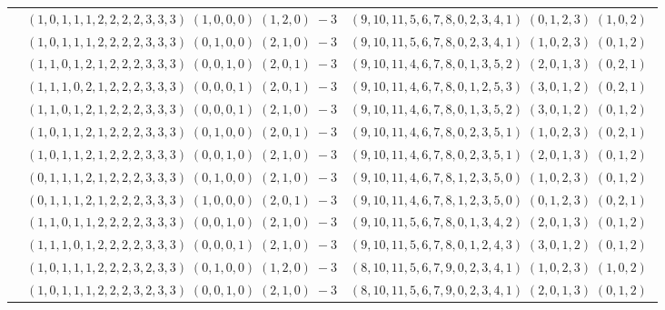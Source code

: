 \documentclass[11pt]{article}
\begin{document}
\begin{longtable}[l]{|c|c|c|}
 \cline{2-3} 
 & $(1 ,0 ,1 ,1 ,1 ,2 ,2 ,2 ,2 ,3 ,3 ,3) \;(1 ,0 ,0 ,0) \;(1 ,2 ,0) \;-3$ & $(9 ,10 ,11 ,5 ,6 ,7 ,8 ,0 ,2 ,3 ,4 ,1) \;(0 ,1 ,2 ,3) \;(1 ,0 ,2) \;$\\ 
 \cline{2-3} 
 & $(1 ,0 ,1 ,1 ,1 ,2 ,2 ,2 ,2 ,3 ,3 ,3) \;(0 ,1 ,0 ,0) \;(2 ,1 ,0) \;-3$ & $(9 ,10 ,11 ,5 ,6 ,7 ,8 ,0 ,2 ,3 ,4 ,1) \;(1 ,0 ,2 ,3) \;(0 ,1 ,2) \;$\\ 
 \cline{2-3} 
 & $(1 ,1 ,0 ,1 ,2 ,1 ,2 ,2 ,2 ,3 ,3 ,3) \;(0 ,0 ,1 ,0) \;(2 ,0 ,1) \;-3$ & $(9 ,10 ,11 ,4 ,6 ,7 ,8 ,0 ,1 ,3 ,5 ,2) \;(2 ,0 ,1 ,3) \;(0 ,2 ,1) \;$\\ 
 \cline{2-3} 
 & $(1 ,1 ,1 ,0 ,2 ,1 ,2 ,2 ,2 ,3 ,3 ,3) \;(0 ,0 ,0 ,1) \;(2 ,0 ,1) \;-3$ & $(9 ,10 ,11 ,4 ,6 ,7 ,8 ,0 ,1 ,2 ,5 ,3) \;(3 ,0 ,1 ,2) \;(0 ,2 ,1) \;$\\ 
 \cline{2-3} 
 & $(1 ,1 ,0 ,1 ,2 ,1 ,2 ,2 ,2 ,3 ,3 ,3) \;(0 ,0 ,0 ,1) \;(2 ,1 ,0) \;-3$ & $(9 ,10 ,11 ,4 ,6 ,7 ,8 ,0 ,1 ,3 ,5 ,2) \;(3 ,0 ,1 ,2) \;(0 ,1 ,2) \;$\\ 
 \cline{2-3} 
 & $(1 ,0 ,1 ,1 ,2 ,1 ,2 ,2 ,2 ,3 ,3 ,3) \;(0 ,1 ,0 ,0) \;(2 ,0 ,1) \;-3$ & $(9 ,10 ,11 ,4 ,6 ,7 ,8 ,0 ,2 ,3 ,5 ,1) \;(1 ,0 ,2 ,3) \;(0 ,2 ,1) \;$\\ 
 \cline{2-3} 
 & $(1 ,0 ,1 ,1 ,2 ,1 ,2 ,2 ,2 ,3 ,3 ,3) \;(0 ,0 ,1 ,0) \;(2 ,1 ,0) \;-3$ & $(9 ,10 ,11 ,4 ,6 ,7 ,8 ,0 ,2 ,3 ,5 ,1) \;(2 ,0 ,1 ,3) \;(0 ,1 ,2) \;$\\ 
 \cline{2-3} 
 & $(0 ,1 ,1 ,1 ,2 ,1 ,2 ,2 ,2 ,3 ,3 ,3) \;(0 ,1 ,0 ,0) \;(2 ,1 ,0) \;-3$ & $(9 ,10 ,11 ,4 ,6 ,7 ,8 ,1 ,2 ,3 ,5 ,0) \;(1 ,0 ,2 ,3) \;(0 ,1 ,2) \;$\\ 
 \cline{2-3} 
 & $(0 ,1 ,1 ,1 ,2 ,1 ,2 ,2 ,2 ,3 ,3 ,3) \;(1 ,0 ,0 ,0) \;(2 ,0 ,1) \;-3$ & $(9 ,10 ,11 ,4 ,6 ,7 ,8 ,1 ,2 ,3 ,5 ,0) \;(0 ,1 ,2 ,3) \;(0 ,2 ,1) \;$\\ 
 \cline{2-3} 
 & $(1 ,1 ,0 ,1 ,1 ,2 ,2 ,2 ,2 ,3 ,3 ,3) \;(0 ,0 ,1 ,0) \;(2 ,1 ,0) \;-3$ & $(9 ,10 ,11 ,5 ,6 ,7 ,8 ,0 ,1 ,3 ,4 ,2) \;(2 ,0 ,1 ,3) \;(0 ,1 ,2) \;$\\ 
 \cline{2-3} 
 & $(1 ,1 ,1 ,0 ,1 ,2 ,2 ,2 ,2 ,3 ,3 ,3) \;(0 ,0 ,0 ,1) \;(2 ,1 ,0) \;-3$ & $(9 ,10 ,11 ,5 ,6 ,7 ,8 ,0 ,1 ,2 ,4 ,3) \;(3 ,0 ,1 ,2) \;(0 ,1 ,2) \;$\\ 
 \cline{2-3} 
 & $(1 ,0 ,1 ,1 ,1 ,2 ,2 ,2 ,3 ,2 ,3 ,3) \;(0 ,1 ,0 ,0) \;(1 ,2 ,0) \;-3$ & $(8 ,10 ,11 ,5 ,6 ,7 ,9 ,0 ,2 ,3 ,4 ,1) \;(1 ,0 ,2 ,3) \;(1 ,0 ,2) \;$\\ 
 \cline{2-3} 
 & $(1 ,0 ,1 ,1 ,1 ,2 ,2 ,2 ,3 ,2 ,3 ,3) \;(0 ,0 ,1 ,0) \;(2 ,1 ,0) \;-3$ & $(8 ,10 ,11 ,5 ,6 ,7 ,9 ,0 ,2 ,3 ,4 ,1) \;(2 ,0 ,1 ,3) \;(0 ,1 ,2) \;$\\ 

\end{longtable}
\end{document}
